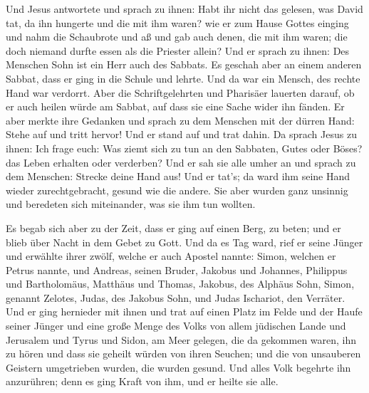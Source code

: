  Und Jesus antwortete und sprach zu ihnen: Habt ihr nicht
das gelesen, was David tat, da ihn hungerte und die mit ihm waren?
 wie er zum Hause Gottes einging und nahm die Schaubrote
und aß und gab auch denen, die mit ihm waren; die doch niemand durfte
essen als die Priester allein?  Und er sprach zu ihnen:
Des Menschen Sohn ist ein Herr auch des Sabbats.  Es
geschah aber an einem anderen Sabbat, dass er ging in die Schule und
lehrte. Und da war ein Mensch, des rechte Hand war verdorrt.
 Aber die Schriftgelehrten und Pharisäer lauerten darauf,
ob er auch heilen würde am Sabbat, auf dass sie eine Sache wider ihn
fänden.  Er aber merkte ihre Gedanken und sprach zu dem
Menschen mit der dürren Hand: Stehe auf und tritt hervor! Und er stand
auf und trat dahin.  Da sprach Jesus zu ihnen: Ich frage
euch: Was ziemt sich zu tun an den Sabbaten, Gutes oder Böses? das Leben
erhalten oder verderben?  Und er sah sie alle umher an
und sprach zu dem Menschen: Strecke deine Hand aus! Und er tat's; da
ward ihm seine Hand wieder zurechtgebracht, gesund wie die andere.
 Sie aber wurden ganz unsinnig und beredeten sich
miteinander, was sie ihm tun wollten.

 Es begab sich aber zu der Zeit, dass er ging auf einen
Berg, zu beten; und er blieb über Nacht in dem Gebet zu Gott.
 Und da es Tag ward, rief er seine Jünger und erwählte
ihrer zwölf, welche er auch Apostel nannte:  Simon,
welchen er Petrus nannte, und Andreas, seinen Bruder, Jakobus und
Johannes, Philippus und Bartholomäus,  Matthäus und
Thomas, Jakobus, des Alphäus Sohn, Simon, genannt Zelotes,
 Judas, des Jakobus Sohn, und Judas Ischariot, den
Verräter.  Und er ging hernieder mit ihnen und trat auf
einen Platz im Felde und der Haufe seiner Jünger und eine große Menge
des Volks von allem jüdischen Lande und Jerusalem und Tyrus und Sidon,
am Meer gelegen,  die da gekommen waren, ihn zu hören und
dass sie geheilt würden von ihren Seuchen; und die von unsauberen
Geistern umgetrieben wurden, die wurden gesund.  Und
alles Volk begehrte ihn anzurühren; denn es ging Kraft von ihm, und er
heilte sie alle.

